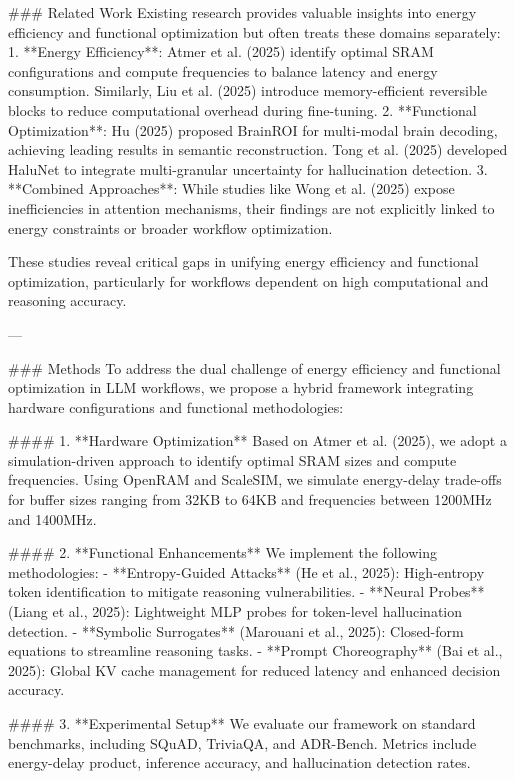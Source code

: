 ### Related Work  
Existing research provides valuable insights into energy efficiency and functional optimization but often treats these domains separately:
1. **Energy Efficiency**: Atmer et al. (2025) identify optimal SRAM configurations and compute frequencies to balance latency and energy consumption. Similarly, Liu et al. (2025) introduce memory-efficient reversible blocks to reduce computational overhead during fine-tuning.
2. **Functional Optimization**: Hu (2025) proposed BrainROI for multi-modal brain decoding, achieving leading results in semantic reconstruction. Tong et al. (2025) developed HaluNet to integrate multi-granular uncertainty for hallucination detection.
3. **Combined Approaches**: While studies like Wong et al. (2025) expose inefficiencies in attention mechanisms, their findings are not explicitly linked to energy constraints or broader workflow optimization.

These studies reveal critical gaps in unifying energy efficiency and functional optimization, particularly for workflows dependent on high computational and reasoning accuracy.

---

### Methods  
To address the dual challenge of energy efficiency and functional optimization in LLM workflows, we propose a hybrid framework integrating hardware configurations and functional methodologies:

#### 1. **Hardware Optimization**  
Based on Atmer et al. (2025), we adopt a simulation-driven approach to identify optimal SRAM sizes and compute frequencies. Using OpenRAM and ScaleSIM, we simulate energy-delay trade-offs for buffer sizes ranging from 32KB to 64KB and frequencies between 1200MHz and 1400MHz.

#### 2. **Functional Enhancements**  
We implement the following methodologies:
- **Entropy-Guided Attacks** (He et al., 2025): High-entropy token identification to mitigate reasoning vulnerabilities.
- **Neural Probes** (Liang et al., 2025): Lightweight MLP probes for token-level hallucination detection.
- **Symbolic Surrogates** (Marouani et al., 2025): Closed-form equations to streamline reasoning tasks.
- **Prompt Choreography** (Bai et al., 2025): Global KV cache management for reduced latency and enhanced decision accuracy.

#### 3. **Experimental Setup**  
We evaluate our framework on standard benchmarks, including SQuAD, TriviaQA, and ADR-Bench. Metrics include energy-delay product, inference accuracy, and hallucination detection rates.

